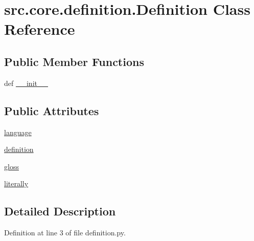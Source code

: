 \hypertarget{classsrc_1_1core_1_1definition_1_1_definition}{\section{src.\+core.\+definition.\+Definition Class Reference}
\label{classsrc_1_1core_1_1definition_1_1_definition}
}
\subsection*{Public Member Functions}
\begin{DoxyCompactItemize}
\item 
def \hyperlink{classsrc_1_1core_1_1definition_1_1_definition_ac40b223a739535bd4141937ab01783e7}{\+\_\+\+\_\+init\+\_\+\+\_\+}
\end{DoxyCompactItemize}
\subsection*{Public Attributes}
\begin{DoxyCompactItemize}
\item 
\hyperlink{classsrc_1_1core_1_1definition_1_1_definition_a334db4f6dddebc769ed5c7b44d2f96bf}{language}
\item 
\hyperlink{classsrc_1_1core_1_1definition_1_1_definition_aa135ea494fc7cef95ce3807f979621bf}{definition}
\item 
\hyperlink{classsrc_1_1core_1_1definition_1_1_definition_abcb3ba5e519cc0e98f149754b5810301}{gloss}
\item 
\hyperlink{classsrc_1_1core_1_1definition_1_1_definition_a568bed4ba9074aeb669875ac640b129e}{literally}
\end{DoxyCompactItemize}


\subsection{Detailed Description}


Definition at line 3 of file definition.\+py.



